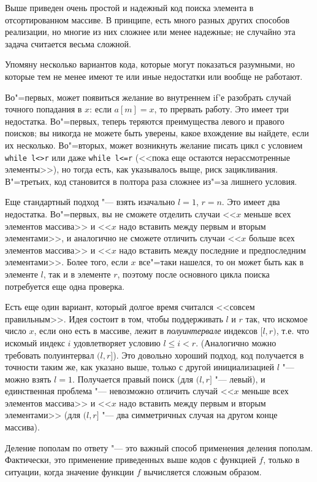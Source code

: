 \documentclass[a4paper,10pt]{problems}
\begin{document}
Выше приведен очень простой и надежный код поиска элемента в отсортированном массиве.
В принципе, есть много разных других способов реализации, но многие из них сложнее
или менее надежные; не случайно эта задача считается весьма сложной.

Упомяну несколько вариантов кода, которые могут показаться разумными, но которые тем не менее 
имеют те или иные недостатки или вообще не работают.

Во"=первых, может появиться желание во внутреннем if'е разобрать случай точного попадания в $x$:
если $a[m]=x$, то прервать работу. Это имеет три недостатка. 
Во"=первых, теперь теряются преимущества левого и правого поисков; вы никогда не можете
быть уверены, какое вхождение вы найдете, если их несколько.
Во"=вторых, может возникнуть желание писать цикл с условием \verb`while l<>r` или даже
\verb`while l<=r` (<<пока еще остаются нерассмотренные элементы>>), 
но тогда есть, как указывалось выще, риск зацикливания.
В"=третьих, код становится в полтора раза сложнее из"=за лишнего условия.

Еще стандартный подход "--- взять изачально $l=1$, $r=n$. Это имеет два недостатка. 
Во"=первых, вы не сможете отделить случаи <<$x$ меньше всех элементов массива>> и 
<<$x$ надо вставить между первым и вторым элементами>>, 
и аналогично не сможете отличить случаи <<$x$ больше всех элементов массива>> и 
<<$x$ надо вставить между последние и предпоследним элементами>>.
Более того, если $x$ все"=таки нашелся, то он может быть как в элементе $l$,
так и в элементе $r$, поэтому после основного цикла поиска потребуется еще одна проверка.

Есть еще один вариант, который долгое время считался <<совсем правильным>>. 
Идея состоит в том, чтобы поддерживать $l$ и $r$ так, что искомое число $x$, 
если оно есть в массиве, лежит в \textit{полуинтервале} индексов $[l,r)$,
т.е. что искомый индекс $i$ удовлетворяет условию $l\leq i<r$.
(Аналогично можно требовать полуинтервал $(l,r]$).
Это довольно хороший подход, код получается в точности таким же, 
как указано выше, только с другой инициализацией $l$ "--- можно взять $l=1$.
Получается правый поиск (для $(l,r]$ "--- левый), и единственная проблема
"--- невозможно отличить случай <<$x$ меньше всех элементов массива>> и 
<<$x$ надо вставить между первым и вторым элементами>>
(для $(l,r]$ "--- два симметричных случая на другом конце массива).

Деление пополам по ответу "--- это важный способ применения деления пополам.
Фактически, это применение приведенных выше кодов с функцией $f$, только 
в ситуации, когда значение функции $f$ вычисляется сложным образом.
\end{document}
